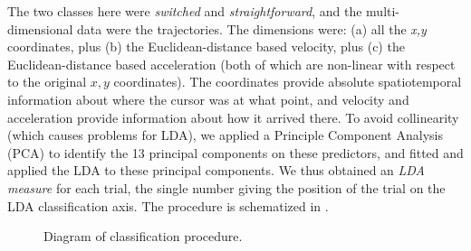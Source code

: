 \documentclass{article}
\begin{document}
The two classes here were \emph{switched} and \emph{straightforward}, and the multi-dimensional data were the trajectories. The dimensions were: (a) all the \textit{x,y} coordinates, plus (b) the Euclidean-distance based velocity, plus (c)  the Euclidean-distance based acceleration (both of which are non-linear with respect to the original $x,y$ coordinates). The coordinates provide absolute spatiotemporal information about where the cursor was at what point, and velocity and acceleration provide information about how  it arrived there.
To avoid collinearity (which causes problems for LDA), we applied a Principle Component Analysis (PCA) to identify the 13 principal components on these predictors, and fitted and applied the LDA to these principal components.
We thus obtained an \emph{LDA measure} for each trial, the single number giving the position of the trial on the LDA classification axis.
The procedure is schematized in .

\begin{figure}

\caption{Diagram of classification procedure.}\label{fig:diagram}
\end{figure}
\end{document}
